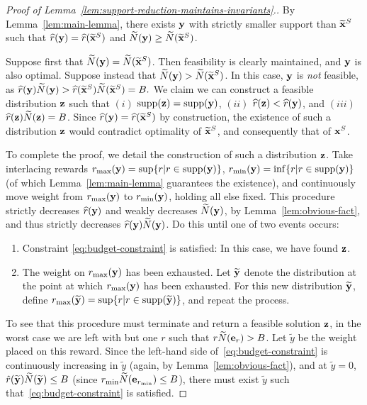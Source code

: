 \documentclass[12pt]{article}
\begin{document}
\begin{proof}[Proof of Lemma~\ref{lem:support-reduction-maintains-invariants}.]
By Lemma~\ref{lem:main-lemma}, there exists $\mathbf{y}$ with strictly smaller support than $\widetilde{\mathbf{x}}^S$ such that $\widehat{r}(\mathbf{y}) = \widehat{r}(\widetilde{\mathbf{x}}^S)$ and $\widetilde{N}(\mathbf{y}) \geq \widetilde{N}(\widetilde{\mathbf{x}}^S)$. 

Suppose first that $\widetilde{N}(\mathbf{y}) = \widetilde{N}(\widetilde{\mathbf{x}}^S)$. Then feasibility is clearly maintained, and $\mathbf{y}$ is also optimal. Suppose instead that $\widetilde{N}(\mathbf{y}) > \widetilde{N}(\widetilde{\mathbf{x}}^S)$. In this case, $\mathbf{y}$ is {\it not} feasible, as 
$\widehat{r}(\mathbf{y})\widetilde{N}(\mathbf{y}) > \widehat{r}(\widetilde{\mathbf{x}}^S)\widetilde{N}(\widetilde{\mathbf{x}}^S) = B.$
We claim {we} %
can construct a {feasible} distribution $\mathbf{z}$ such that $(i)$ $\text{supp}(\mathbf{z}) = \text{supp}(\mathbf{y})$, $(ii)$ $\widehat{r}(\mathbf{z}) < \widehat{r}(\mathbf{y})$, and $(iii)$ $\widehat{r}(\mathbf{z})\widetilde{N}(\mathbf{z}) = B$. Since $\widehat{r}(\mathbf{y}) = \widehat{r}(\widetilde{\mathbf{x}}^S)$ by construction, the existence of such a distribution $\mathbf{z}$ would contradict optimality of $\widetilde{\mathbf{x}}^S$, and consequently that of $\mathbf{x}^S$. 

To complete the proof, we detail the construction of such a distribution $\mathbf{z}$. Take interlacing rewards $r_{\max}(\mathbf{y}) = \sup \{r | r \in \text{supp}(\mathbf{y})\}$, $r_{\min}(\mathbf{y}) = \inf\{r | r \in \text{supp}(\mathbf{y})\}$ (of which Lemma~\ref{lem:main-lemma} guarantees the existence), and continuously move weight from $r_{\max}(\mathbf{y})$ to $r_{\min}(\mathbf{y})$, holding all else fixed. This procedure strictly decreases $\widehat{r}(\mathbf{y})$ and weakly decreases $\widetilde{N}(\mathbf{y})$, by Lemma~\ref{lem:obvious-fact}, and thus strictly decreases $\widehat{r}(\mathbf{y})\widetilde{N}(\mathbf{y})$. Do this until one of two events occurs:
\begin{enumerate}
\item Constraint \eqref{eq:budget-constraint} is satisfied: In this case, we have found $\mathbf{z}$.
\item The weight on $r_{\max}(\mathbf{y})$ has been exhausted. Let $\widetilde{\mathbf{y}}$ denote the distribution at the point at which $r_{\max}(\mathbf{y})$ has been exhausted. For this new distribution $\widetilde{\mathbf{y}}$, define $r_{\max}(\widetilde{\mathbf{y}}) = \sup\{r | r \in \text{supp}(\widetilde{\mathbf{y}})\}$, and repeat the process.
\end{enumerate}
To see that this procedure must terminate and return a feasible solution $\mathbf{z}$, in the worst case we are left with but one $r$ such that $r\widetilde{N}(\mathbf{e}_r) > B$. Let $\widetilde{y}$ be the weight placed on this reward. Since the left-hand side of~\eqref{eq:budget-constraint} is continuously increasing in $\widetilde{y}$ (again, by Lemma~\ref{lem:obvious-fact}), and at $\widetilde{y} = 0$, $\hat{r}(\widetilde{\mathbf{y}})\widetilde{N}(\widetilde{\mathbf{y}}) \leq B$ (since $r_{\min}\widetilde{N}(\mathbf{e}_{r_{\min}}) \leq B$), there must exist $\widetilde{y}$ such that~\eqref{eq:budget-constraint} is satisfied. 
\end{proof}
\end{document}
